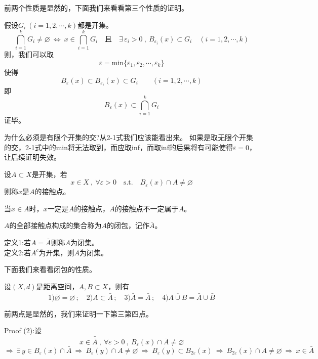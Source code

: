 前两个性质是显然的，下面我们来看看第三个性质的证明。

假设$G_i \ (i=1,2,\cdots,k)$都是开集。
\[\bigcap_{i=1}^kG_i \neq \varnothing \ \Leftrightarrow \ x \in \bigcap_{i=1}^kG_i  \quad \text{且} \quad \exists \, \varepsilon_i >0 \ , \ B_{\varepsilon_i}(x) \subset G_i \quad (i=1,2,\cdots,k)\]
则，我们可以取
\[\varepsilon=\text{min}\{\varepsilon_1,\varepsilon_2,\cdots,\varepsilon_k\} \tag{2-1}\]
使得
\[B_{\varepsilon}(x) \subset B_{\varepsilon_i}(x) \subset G_i \qquad (i=1,2,\cdots,k)\]
即
\[B_{\varepsilon}(x) \subset \bigcap_{i=1}^kG_i\]
证毕。

为什么必须是有限个开集的交?从2-1式我们应该能看出来。
如果是取无限个开集的交，2-1式中的min将无法取到，而应取inf，而取inf的后果将有可能使得$\varepsilon=0$，让后续证明失效。
\begin{definition}[接触点]
    设$A \subset X$是开集，若
    \[x \in X \ , \ \forall \varepsilon>0 \quad \text{s.t.} \quad B_{\varepsilon}(x) \cap A \neq \varnothing\]
    则称$x$是$A$的接触点。
\end{definition}

当$x \in A$时，$x$一定是$A$的接触点，$A$的接触点不一定属于$A$。

\begin{definition}[闭包]
    $A$的全部接触点构成的集合称为$A$的闭包，记作$\bar{A}$。
\end{definition}
\begin{definition}[闭集]
    定义1:若$A=\bar{A}$则称$A$为闭集。\\
    定义2:若$A^c$为开集，则$A$为闭集。
\end{definition}

下面我们来看看闭包的性质。
\begin{theorem}
    设$(X,d)$是距离空间，$A,B \subset X$，则有
    \[1)\bar{\varnothing}=\varnothing \, ; \quad 2)A \subset \bar{A} \, ; \quad 3)\bar{\bar{A}}=\bar{A} \, ; \quad 4)\overline{A \cup B}=\bar{A} \cup \bar{B}\]
\end{theorem}

前两点是显然的，我们来证明一下第三第四点。

Proof (2):设
\[x \in \bar{\bar{A}} \ , \ \forall \varepsilon>0 \ , \ B_{\varepsilon}(x) \cap \bar{A} \neq \varnothing\]
\[\Rightarrow \ \exists \, y \in B_{\varepsilon}(x) \cap \bar{A} \ \Rightarrow \ B_{\varepsilon}(y) \cap A \neq \varnothing \ \Rightarrow \ B_{\varepsilon}(y) \subset B_{2\varepsilon}(x) \ \Rightarrow \ B_{2\varepsilon}(x) \cap A \neq \varnothing \ \Rightarrow \ x \in \bar{A}\]

